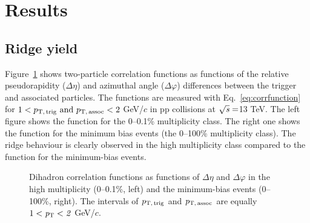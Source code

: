 
\section {Results}
\label{sec:results}

\subsection{Ridge yield}

Figure~\ref{fig:PlotCorrMBHMT} shows two-particle correlation functions as functions of the relative pseudorapidity ($\Delta \eta$) and azimuthal angle ($\Delta \varphi$) differences between the trigger and associated particles. The functions are measured with Eq.~\ref{eq:corrfunction} for $1 < p_\mathrm{T,\,trig}~\mathrm{and}~p_\mathrm{T,\,assoc} < 2$ GeV/$c$ in pp collisions at $\sqrt{\it{s}} = $\unit{13} {\rm{}TeV}. The left figure shows the function for the 0--0.1\% multiplicity class. The right one shows the function for the minimum bias events (the 0--100\% multiplicity class). The ridge behaviour is clearly observed in the high multiplicity class compared to the function for the minimum-bias events.

\begin{figure}[h!]
	\centering
	\caption{ Dihadron correlation functions as functions of $\Delta\eta$ and $\Delta\varphi$ in the high multiplicity (0--0.1\%, left) and the minimum-bias events (0--100\%, right). The intervals of $p_\mathrm{T,\,trig}$ and $p_\mathrm{T,\,assoc}$ are equally $1 < \it{p}_{\rm{T}} < 2$ GeV/$c$. }
	\label{fig:PlotCorrMBHMT}
\end{figure}

